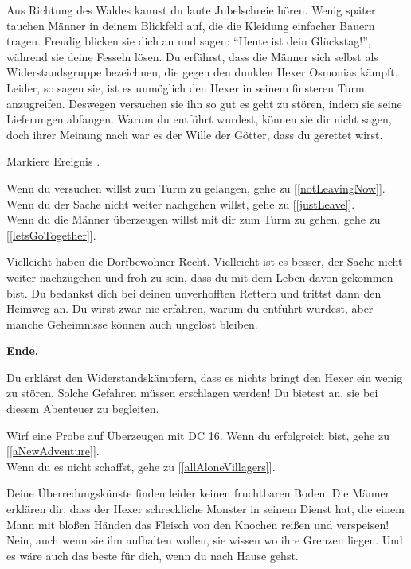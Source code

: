 Aus Richtung des Waldes kannst du laute Jubelschreie hören. Wenig später tauchen Männer in deinem Blickfeld auf, die die Kleidung einfacher Bauern tragen. Freudig blicken sie dich an und sagen: ``Heute ist dein Glückstag!'', während sie deine Fesseln lösen. Du erfährst, dass die Männer sich selbst als Widerstandsgruppe bezeichnen, die gegen den dunklen Hexer Osmonias kämpft. Leider, so sagen sie, ist es unmöglich den Hexer in seinem finsteren Turm anzugreifen. Deswegen versuchen sie ihn so gut es geht zu stören, indem sie seine Lieferungen abfangen. Warum du entführt wurdest, können sie dir nicht sagen, doch ihrer Meinung nach war es der Wille der Götter, dass du gerettet wirst.

Markiere Ereignis .

Wenn du versuchen willst zum Turm zu gelangen, gehe zu [\ref{notLeavingNow}].
\\Wenn du der Sache nicht weiter nachgehen willst, gehe zu [\ref{justLeave}].
\\Wenn du die Männer überzeugen willst mit dir zum Turm zu gehen, gehe zu [\ref{letsGoTogether}].


Vielleicht haben die Dorfbewohner Recht. Vielleicht ist es besser, der Sache nicht weiter nachzugehen und froh zu sein, dass du mit dem Leben davon gekommen bist. Du bedankst dich bei deinen unverhofften Rettern und trittst dann den Heimweg an. Du wirst zwar nie erfahren, warum du entführt wurdest, aber manche Geheimnisse können auch ungelöst bleiben.

\textbf{Ende.}


Du erklärst den Widerstandskämpfern, dass es nichts bringt den Hexer ein wenig zu stören. Solche Gefahren müssen erschlagen werden! Du bietest an, sie bei diesem Abenteuer zu begleiten.

Wirf eine Probe auf Überzeugen mit DC 16. Wenn du erfolgreich bist, gehe zu [\ref{aNewAdventure}].
\\Wenn du es nicht schaffst, gehe zu [\ref{allAloneVillagers}].


Deine Überredungskünste finden leider keinen fruchtbaren Boden. Die Männer erklären dir, dass der Hexer schreckliche Monster in seinem Dienst hat, die einem Mann mit bloßen Händen das Fleisch von den Knochen reißen und verspeisen! Nein, auch wenn sie ihn aufhalten wollen, sie wissen wo ihre Grenzen liegen. Und es wäre auch das beste für dich, wenn du nach Hause gehst.

